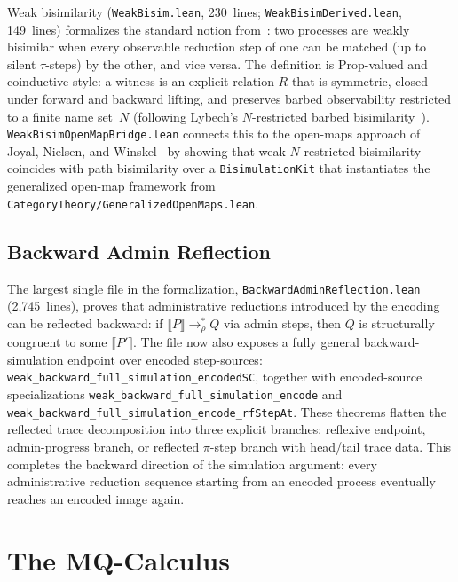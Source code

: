 \documentclass[11pt]{article}
\theoremstyle{definition}
\theoremstyle{remark}
\begin{document}
Weak bisimilarity (\texttt{WeakBisim.lean}, 230~lines;
\texttt{WeakBisimDerived.lean}, 149~lines) formalizes the standard
notion from~\cite{SangiorgiWalker2001}: two processes are weakly
bisimilar when every observable reduction step of one can be matched
(up to silent $\tau$-steps) by the other, and vice versa.
The definition is Prop-valued and coinductive-style: a witness is an
explicit relation $R$ that is symmetric, closed under forward and
backward lifting, and preserves barbed observability restricted to a
finite name set~$N$ (following Lybech's $N$-restricted barbed
bisimilarity~\cite{Lybech2022}).
\texttt{WeakBisimOpenMapBridge.lean} connects this to the open-maps
approach of Joyal, Nielsen, and Winskel~\cite{JoyalNielsenWinskel1996}
by showing that weak $N$-restricted bisimilarity coincides with
path bisimilarity over a \texttt{BisimulationKit} that instantiates the
generalized open-map framework from
\texttt{CategoryTheory/GeneralizedOpenMaps.lean}.

\subsection{Backward Admin Reflection}

The largest single file in the formalization,
\texttt{BackwardAdminReflection.lean} (2{,}745~lines), proves that
administrative reductions introduced by the encoding can be reflected
backward: if $\llbracket P \rrbracket \to_\rho^* Q$ via admin steps,
then $Q$ is structurally congruent to some $\llbracket P' \rrbracket$.
The file now also exposes a fully general backward-simulation endpoint over
encoded step-sources:
\texttt{weak\_backward\_full\_simulation\_encodedSC}, together with encoded-source
specializations
\texttt{weak\_backward\_full\_simulation\_encode} and
\texttt{weak\_backward\_full\_simulation\_encode\_rfStepAt}.
These theorems flatten the reflected trace decomposition into three explicit
branches: reflexive endpoint, admin-progress branch, or reflected $\pi$-step
branch with head/tail trace data.  This completes the backward direction of
the simulation argument: every administrative reduction sequence starting
from an encoded process eventually reaches an encoded image again.


\section{The MQ-Calculus}
\label{sec:mq}
\end{document}
